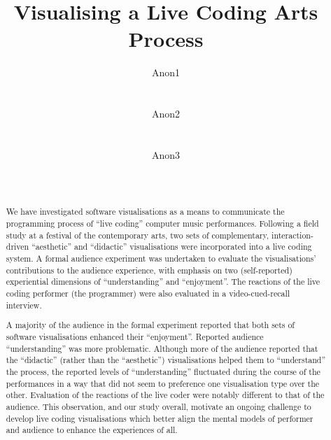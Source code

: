 \documentclass{sig-alternate}
\begin{document}

\title{Visualising a Live Coding Arts Process}

\author{
\alignauthor Anon1\\
       \affaddr{-}\\
       \affaddr{-}\\
       \email{-}
\alignauthor Anon2\\
       \affaddr{-}\\
       \affaddr{-}\\
       \email{-}
\alignauthor Anon3\\
       \affaddr{-}\\
       \affaddr{-}\\
       \email{-}
}

\maketitle
\begin{abstract}

  We have investigated software visualisations as a means to
  communicate the programming process of ``live coding'' computer
  music performances. Following a field study at a festival of the
  contemporary arts, two sets of complementary, interaction-driven
  ``aesthetic'' and ``didactic'' visualisations were incorporated into a
  live coding system. A formal audience experiment was undertaken to
  evaluate the visualisations' contributions to the audience
  experience, with emphasis on two (self-reported) experiential
  dimensions of ``understanding'' and ``enjoyment''. The reactions of
  the live coding performer (the programmer) were also evaluated in a
  video-cued-recall interview.

  A majority of the audience in the formal experiment reported that
  both sets of software visualisations enhanced their ``enjoyment''.
  Reported audience ``understanding'' was more problematic. Although
  more of the audience reported that the ``didactic'' (rather than the
  ``aesthetic'') visualisations helped them to ``understand'' the
  process, the reported levels of ``understanding'' fluctuated during
  the course of the performances in a way that did not seem to
  preference one visualisation type over the other. Evaluation of the
  reactions of the live coder were notably different to that of the
  audience. This observation, and our study overall, motivate an
  ongoing challenge to develop live coding visualisations which better
  align the mental models of performer and audience to enhance the
  experiences of all.

\end{abstract}
\end{document}
